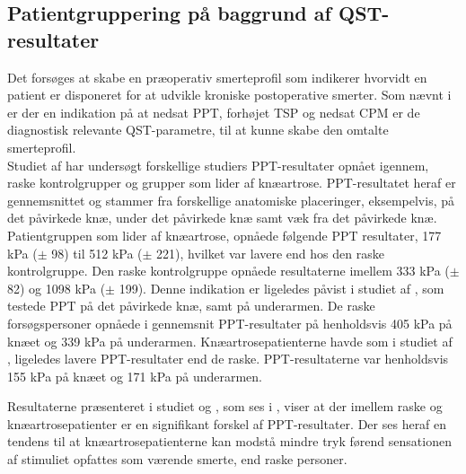 \subsection{Patientgruppering på baggrund af QST-resultater}
Det forsøges at skabe en præoperativ smerteprofil som indikerer hvorvidt en patient er disponeret for at udvikle kroniske postoperative smerter. Som nævnt i  er der en indikation på at nedsat PPT, forhøjet TSP og nedsat CPM er de diagnostisk relevante QST-parametre, til at kunne skabe den omtalte smerteprofil. \\
Studiet af  har undersøgt forskellige studiers PPT-resultater opnået igennem, raske kontrolgrupper og grupper som lider af knæartrose. PPT-resultatet heraf er gennemsnittet og stammer fra forskellige anatomiske placeringer, eksempelvis, på det påvirkede knæ, under det påvirkede knæ samt væk fra det påvirkede knæ. Patientgruppen som lider af knæartrose, opnåede følgende PPT resultater, 177 kPa ($\pm$ 98) til 512 kPa ($\pm$ 221), hvilket var lavere end hos den raske kontrolgruppe. Den raske kontrolgruppe opnåede resultaterne imellem 333 kPa ($\pm$ 82) og 1098 kPa ($\pm$ 199). \citep{Suokas2012} Denne indikation er ligeledes påvist i studiet af , som testede PPT på det påvirkede knæ, samt på underarmen. De raske forsøgspersoner opnåede i gennemsnit PPT-resultater på henholdsvis 405 kPa på knæet og 339 kPa på underarmen. Knæartrosepatienterne havde som i studiet af , ligeledes lavere PPT-resultater end de raske. PPT-resultaterne var henholdsvis 155 kPa på knæet og 171 kPa på underarmen. \citep{Wylde2013} 

\begin{table}[H]
	\centering
	\caption{I tabellen ses resultaterne vedrørende PPT-målinger på henholdsvis raske person og knæartrsoe patienter.  }
	\label{tab:PPT_rask_syg}
\end{table}\vspace{-.25cm}
Resultaterne præsenteret i studiet  og , som ses i , viser at der imellem raske og knæartrosepatienter er en signifikant forskel af PPT-resultater. Der ses heraf en tendens til at knæartrosepatienterne kan modstå mindre tryk førend sensationen af stimuliet opfattes som værende smerte, end raske personer.

